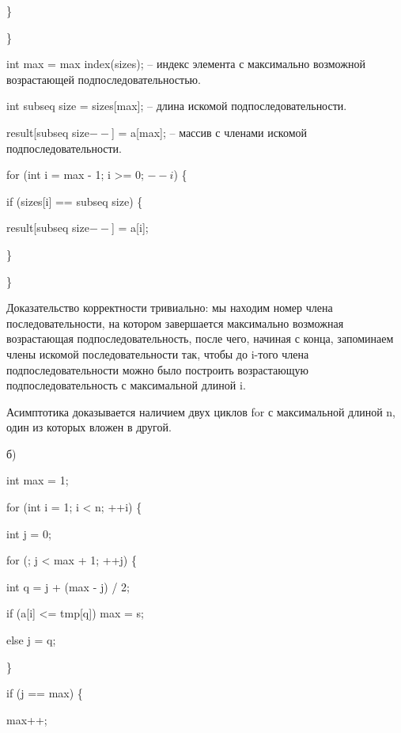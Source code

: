 \documentclass[12pt]{extreport}
\theoremstyle{definiton}
\theoremstyle{definition}
\theoremstyle{definition}
\begin{document}
	\hspace{4mm} \}
	
	\}

	int max = max index(sizes); -- индекс элемента с максимально возможной возрастающей подпоследовательностью.

	int subseq size = sizes[max]; -- длина искомой подпоследовательности.

	result[subseq size$--$] = a[max]; -- массив с членами искомой подпоследовательности.

	for (int i = max - 1; i >= 0; $--i$) \{
		
		\hspace{4mm} if (sizes[i] == subseq size) \{
			
			\hspace{8mm} result[subseq size$--$] = a[i];
		
		\hspace{4mm} \}
	
	\}

	Доказательство корректности тривиально: мы находим номер члена последовательности, на котором завершается максимально возможная возрастающая подпоследовательность,
	после чего, начиная с конца, запоминаем члены искомой последовательности так, чтобы до i-того члена подпоследовательности можно было построить возрастающую подпоследовательность с максимальной длиной i.

	Асимптотика доказывается наличием двух циклов for с максимальной длиной n, один из которых вложен в другой.

	б)

	int max = 1;

	for (int i = 1; i < n; ++i) \{
		
	\hspace{4mm} int j = 0;

	\hspace{4mm} for (; j < max + 1; ++j) \{
		
		\hspace{8mm} int q = j + (max - j) / 2;

		\hspace{8mm} if (a[i] <= tmp[q]) max = s;

		\hspace{8mm} else j = q;
	
	\hspace{4mm} \}
	
	\hspace{4mm} if (j == max) \{
		
		\hspace{8mm} max++;
\end{document}
